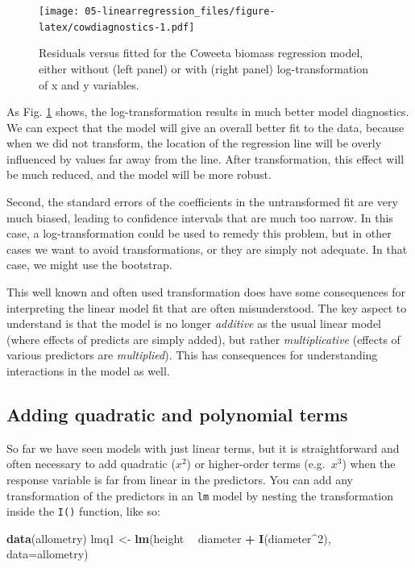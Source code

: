 \documentclass[]{book}
\newenvironment{Shaded}{\begin{snugshade}}{\end{snugshade}}
\newcommand{\DataTypeTok}[1]{\textcolor[rgb]{0.13,0.29,0.53}{#1}}
\newcommand{\DecValTok}[1]{\textcolor[rgb]{0.00,0.00,0.81}{#1}}
\newcommand{\KeywordTok}[1]{\textcolor[rgb]{0.13,0.29,0.53}{\textbf{#1}}}
\newcommand{\NormalTok}[1]{#1}
\newcommand{\OperatorTok}[1]{\textcolor[rgb]{0.81,0.36,0.00}{\textbf{#1}}}
\newcommand{\StringTok}[1]{\textcolor[rgb]{0.31,0.60,0.02}{#1}}
\begin{document}
\begin{figure}
\centering
\texttt{[image: 05-linearregression\_files/figure-latex/cowdiagnostics-1.pdf]}
\caption{\label{fig:cowdiagnostics}Residuals versus fitted for the Coweeta biomass regression model, either without (left panel) or with (right panel) log-transformation of x and y variables.}
\end{figure}

As Fig. \ref{fig:cowdiagnostics} shows, the log-transformation results in much better model diagnostics. We can expect that the model will give an overall better fit to the data, because when we did not transform, the location of the regression line will be overly influenced by values far away from the line. After transformation, this effect will be much reduced, and the model will be more robust.

Second, the standard errors of the coefficients in the untransformed fit are very much biased, leading to confidence intervals that are much too narrow. In this case, a log-transformation could be used to remedy this problem, but in other cases we want to avoid transformations, or they are simply not adequate. In that case, we might use the bootstrap.

This well known and often used transformation does have some consequences for interpreting the linear model fit that are often misunderstood. The key aspect to understand is that the model is no longer \emph{additive} as the usual linear model (where effects of predicts are simply added), but rather \emph{multiplicative} (effects of various predictors are \emph{multiplied}). This has consequences for understanding interactions in the model as well.

\hypertarget{quadlm}{%
\subsection{Adding quadratic and polynomial terms}\label{quadlm}}

So far we have seen models with just linear terms, but it is straightforward and often necessary to add quadratic (\(x^2\)) or higher-order terms (e.g.~\(x^3\)) when the response variable is far from linear in the predictors. You can add any transformation of the predictors in an \texttt{lm} model by nesting the transformation inside the \texttt{I()} function, like so:

\begin{Shaded}
\begin{Highlighting}[]
\KeywordTok{data}\NormalTok{(allometry)}
\NormalTok{lmq1 <-}\StringTok{ }\KeywordTok{lm}\NormalTok{(height }\OperatorTok{~}\StringTok{ }\NormalTok{diameter }\OperatorTok{+}\StringTok{ }\KeywordTok{I}\NormalTok{(diameter}\OperatorTok{^}\DecValTok{2}\NormalTok{), }\DataTypeTok{data=}\NormalTok{allometry)}
\end{Highlighting}
\end{Shaded}
\end{document}

